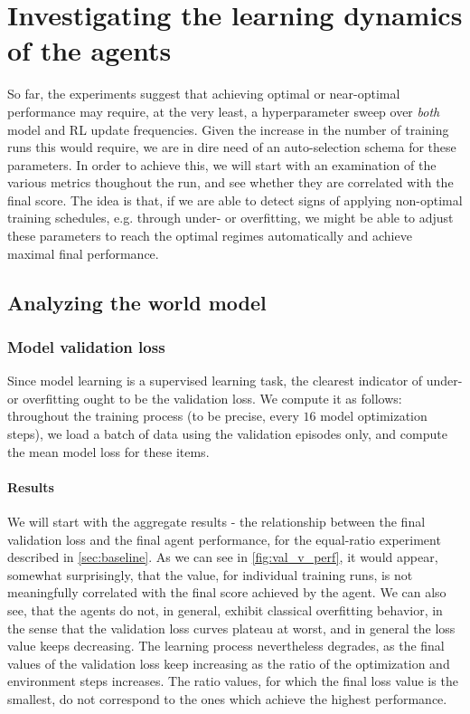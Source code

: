 \documentclass[en]{pracamgr}
\begin{document}
\section{Investigating the learning dynamics of the agents}

So far, the experiments suggest that achieving optimal or near-optimal performance may require, at the very least, a hyperparameter sweep over \emph{both} model and RL update frequencies. Given the increase in the number of training runs this would require, we are in dire need of an auto-selection schema for these parameters. In order to achieve this, we will start with an examination of the various metrics thoughout the run, and see whether they are correlated with the final score. The idea is that, if we are able to detect signs of applying non-optimal training schedules, e.g. through under- or overfitting, we might be able to adjust these parameters to reach the optimal regimes automatically and achieve maximal final performance.

\subsection{Analyzing the world model}
\label{ssec:wm_analysis}

\subsubsection{Model validation loss}

Since model learning is a supervised learning task, the clearest indicator of under- or overfitting ought to be the validation loss. We compute it as follows: throughout the training process (to be precise, every $16$ model optimization steps), we load a batch of data using the validation episodes only, and compute the mean model loss for these items.

\paragraph{Results} We will start with the aggregate results - the relationship between the final validation loss and the final agent performance, for the equal-ratio experiment described in \autoref{sec:baseline}. As we can see in \autoref{fig:val_v_perf}, it would appear, somewhat surprisingly, that the value, for individual training runs, is not meaningfully correlated with the final score achieved by the agent. We can also see, that the agents do not, in general, exhibit classical overfitting behavior, in the sense that the validation loss curves plateau at worst, and in general the loss value keeps decreasing. The learning process nevertheless degrades, as the final values of the validation loss keep increasing as the ratio of the optimization and environment steps increases. The ratio values, for which the final loss value is the smallest, do not correspond to the ones which achieve the highest performance.
\end{document}
